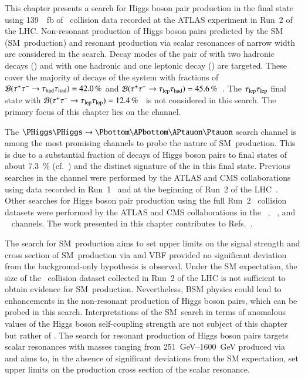 This chapter presents a search for Higgs boson pair production in the \bbtautau
final state using \SI{139}{\per\femto\barn} of \pp~collision data recorded at
the ATLAS experiment in Run~2 of the LHC. Non-resonant production of Higgs
boson pairs predicted by the SM (SM~\HH production) and resonant production via
scalar resonances of narrow width are considered in the search. Decay modes of
the pair of \tauleptons with two hadronic \taulepton decays (\hadhad) and with
one hadronic and one leptonic \taulepton decay (\lephad) are targeted. These
cover the majority of decays of the \tautau system with fractions of
$\mathcal{B}(\tau^{+} \tau^{-} \to \tau_{\text{had}}\tau_{\text{had}}) = \SI{42.0}{\percent}$ and
$\mathcal{B}(\tau^{+} \tau^{-} \to \tau_{\text{lep}}\tau_{\text{had}}) =
\SI{45.6}{\percent}$~\cite{Zyla:2020zbs}. The $\tau_{\text{lep}}\tau_{\text{lep}}$ final state with
$\mathcal{B}(\tau^{+} \tau^{-} \to \tau_{\text{lep}}\tau_{\text{lep}}) =
\SI{12.4}{\percent}$~\cite{Zyla:2020zbs} is not considered in this search. The
primary focus of this chapter lies on the \hadhad channel.

The $\HH \to \bbtautau$ search channel is among the most promising channels to
probe the nature of SM~\HH production. This is due to a substantial fraction of
decays of Higgs boson pairs to \bbtautau final states of about
\SI{7.3}{\percent} (cf.~) and the distinct
signature of the \tauleptons in this final state. Previous searches in the
\bbtautau channel were performed by the ATLAS and CMS collaborations using data
recorded in Run~1~\cite{HIGG-2013-33,CMS-HIG-15-013} and at the beginning of
Run~2 of the LHC~\cite{HIGG-2016-16-witherratum,CMS-HIG-17-002}.  Other searches
for Higgs boson pair production using the full Run~2 \pp~collision datasets were
performed by the ATLAS and CMS collaborations in the
\bbtautau~\cite{CMS-PAS-HIG-20-010},
\bbbb~\cite{HDBS-2019-29,CMS-HIG-20-005}, and
\bbyy~\cite{HDBS-2018-34,CMS-HIG-19-018} channels.
The work presented in this chapter contributes to
Refs.~\cite{ATLAS-CONF-2021-030,HDBS-2018-40}.

The search for SM~\HH production aims to set upper limits on the signal strength
and cross section of SM~\HH production via \ggF and VBF provided no significant
deviation from the background-only hypothesis is observed. Under the SM
expectation, the size of the \pp~collision dataset collected in Run~2 of the LHC
is not sufficient to obtain evidence for SM~\HH production.  Nevertheless, BSM
physics could lead to enhancements in the non-resonant production of Higgs boson
pairs, which can be probed in this search.
Interpretations of the SM~\HH search in terms of anomalous values of the Higgs
boson self-coupling strength are not subject of this chapter but rather of
. The search for resonant production of Higgs
boson pairs targets scalar resonances with masses ranging from
\SIrange{251}{1600}{\GeV} produced via \ggF and aims to, in the absence of
significant deviations from the SM expectation, set upper limits on the
production cross section of the scalar resonance.

